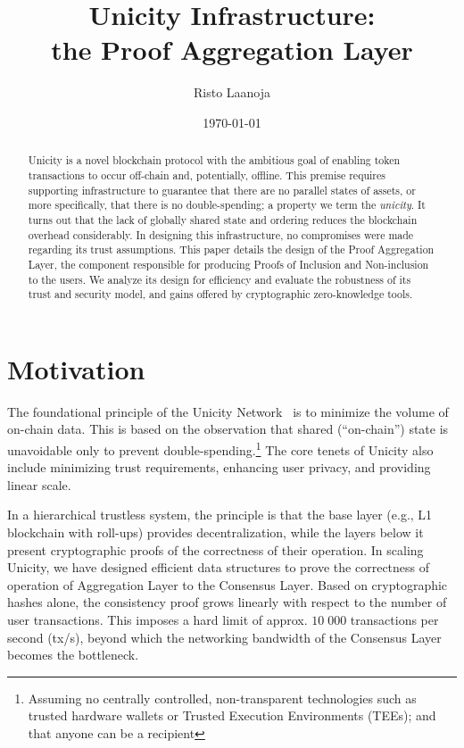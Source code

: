 \documentclass[twocolumn]{article}
\title{Unicity Infrastructure:\\
    the Proof Aggregation Layer}
\author[1]{Risto Laanoja}
\affil[1]{Unicity Labs}
\date{\today}
\begin{document}
\maketitle

\begin{abstract}
Unicity is a novel blockchain protocol with the ambitious goal of enabling token transactions to occur off-chain and, potentially, offline. This premise requires supporting infrastructure to guarantee that there are no parallel states of assets, or more specifically, that there is no double-spending; a property we term the \textit{unicity}. It turns out that the lack of globally shared state and ordering reduces the blockchain overhead considerably. In designing this infrastructure, no compromises were made regarding its trust assumptions. This paper details the design of the Proof Aggregation Layer, the component responsible for producing Proofs of Inclusion and Non-inclusion to the users. We analyze its design for efficiency and evaluate the robustness of its trust and security model, and gains offered by cryptographic zero-knowledge tools.
\end{abstract}


\section{Motivation}

The foundational principle of the Unicity Network~\cite{wp} is to minimize the volume of on-chain data. This is based on the observation that shared (``on-chain'') state is unavoidable only to prevent double-spending.\footnote{Assuming no centrally controlled, non-transparent technologies such as trusted hardware wallets or Trusted Execution Environments (TEEs); and that anyone can be a recipient} The core tenets of Unicity also include minimizing trust requirements, enhancing user privacy, and providing linear scale.

In a hierarchical trustless system, the principle is that the base layer (e.g., L1 blockchain with roll-ups) provides decentralization, while the layers below it present cryptographic proofs of the correctness of their operation. In scaling Unicity, we have designed efficient data structures to prove the correctness of operation of Aggregation Layer to the Consensus Layer. Based on cryptographic hashes alone, the consistency proof grows linearly with respect to the number of user transactions. This imposes a hard limit of approx. $10\;000$ transactions per second (tx/s), beyond which the networking bandwidth of the Consensus Layer becomes the bottleneck.
\end{document}
